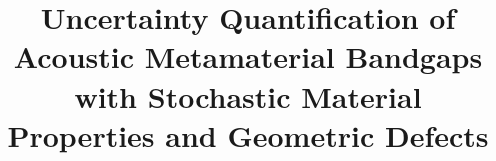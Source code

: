 \documentclass[preprint,review,12pt]{elsarticle}
\begin{document}
\linenumbers
\onehalfspacing

\begin{frontmatter}


\title{Uncertainty Quantification of Acoustic Metamaterial Bandgaps with Stochastic Material Properties and Geometric Defects}




\end{frontmatter}
\end{document}
